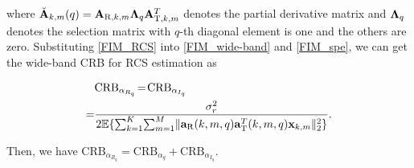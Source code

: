 \documentclass[9pt,final,journal,twocolumn]{IEEEtran}
\newtheorem{remark}{Remark}
\begin{document}
where $\breve{\bf A}_{k,m}(q)={\bf A}_{\mathrm{R},k,m}{\bf \Lambda}_{q} {\bf A}_{\mathrm{T},k,m}^T$ denotes the partial derivative matrix and ${\bf \Lambda}_{q}$ denotes the selection matrix with $q$-th diagonal element is one and the others are zero. Substituting \eqref{FIM_RCS} into \eqref{FIM_wide-band} and \eqref{FIM_spe}, we can get the wide-band CRB for RCS estimation as \cite{liang2021CramerRao} 
\begin{small}
\begin{align} \label{CRB_resp.2.2}
&\mathrm{CRB}_{\alpha_{R_{q}}} \!=\!\mathrm{CRB}_{\alpha_{I_{q}}} \nonumber \\
= &\frac{\sigma_r^2}{2\mathbb{E}\{{\sum}_{k=1}^K{\sum}_{m=1}^M\|{\bf a}_{\mathrm{R}}(k,m,q){\bf a}_{\mathrm{T}}^{T}(k,m,q){\bf x}_{k,m}\|_2^2\}}. %
\end{align}
\end{small}
Then, we have $\mathrm{CRB}_{\alpha_{R_{q}}}=\mathrm{CRB}_{\alpha_q}+\mathrm{CRB}_{\alpha_{I_{q}}}$.


\vspace{-0.2cm}
\end{document}
